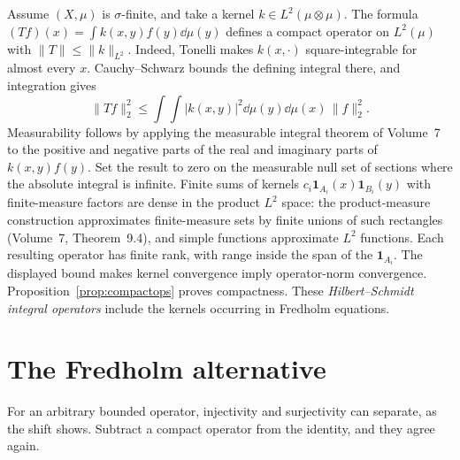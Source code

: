 \begin{example}\label{ex:hilbertschmidt}
Assume $(X,\mu)$ is $\sigma$-finite, and take a kernel $k\in L^2(\mu\otimes\mu)$. The formula
$(Tf)(x)=\int k(x,y)f(y)\dd\mu(y)$
defines a compact operator on $L^2(\mu)$ with $\|T\|\le\|k\|_{L^2}$.
Indeed, Tonelli makes $k(x,\cdot)$ square-integrable for almost every $x$. Cauchy--Schwarz bounds the defining integral there, and integration gives
\[
\|Tf\|_2^2\le\int\!\int|k(x,y)|^2\dd\mu(y)\dd\mu(x)\,\|f\|_2^2.
\]
Measurability follows by applying the measurable integral theorem of Volume~7 to the positive and negative parts of the real and imaginary parts of $k(x,y)f(y)$. Set the result to zero on the measurable null set of sections where the absolute integral is infinite. Finite sums of kernels $c_i\mathbf1_{A_i}(x)\mathbf1_{B_i}(y)$ with finite-measure factors are dense in the product $L^2$ space: the product-measure construction approximates finite-measure sets by finite unions of such rectangles (Volume~7, Theorem~9.4), and simple functions approximate $L^2$ functions. Each resulting operator has finite rank, with range inside the span of the $\mathbf1_{A_i}$. The displayed bound makes kernel convergence imply operator-norm convergence. Proposition~\ref{prop:compactops} proves compactness. These \emph{Hilbert--Schmidt integral operators} include the kernels occurring in Fredholm equations.
\end{example}

\section{The Fredholm alternative}

For an arbitrary bounded operator, injectivity and surjectivity can separate, as the shift shows. Subtract a compact operator from the identity, and they agree again.

